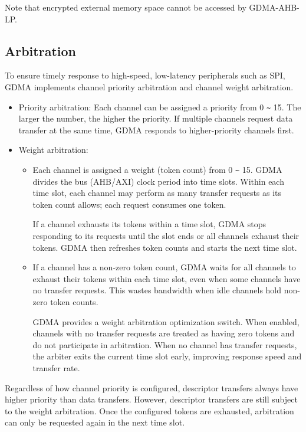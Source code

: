 \documentclass[main\_\_EN.tex]{subfiles}
\begin{document}
Note that encrypted external memory space cannot be accessed by GDMA-AHB-LP.


\subsection{Arbitration}

To ensure timely response to high-speed, low-latency peripherals such as SPI, GDMA implements channel priority arbitration and channel weight arbitration.

\begin{itemize}
    \item Priority arbitration: Each channel can be assigned a priority from 0 \verb+~+ 15. The larger the number, the higher the priority. If multiple channels request data transfer at the same time, GDMA responds to higher-priority channels first.
    \item Weight arbitration:
        \begin{itemize}
            \item Each channel is assigned a weight (token count) from 0 \verb+~+ 15. GDMA divides the bus (AHB/AXI) clock period into time slots. Within each time slot, each channel may perform as many transfer requests as its token count allows; each request consumes one token.

            If a channel exhausts its tokens within a time slot, GDMA stops responding to its requests until the slot ends or all channels exhaust their tokens. GDMA then refreshes token counts and starts the next time slot.
            \item If a channel has a non-zero token count, GDMA waits for all channels to exhaust their tokens within each time slot, even when some channels have no transfer requests. This wastes bandwidth when idle channels hold non-zero token counts.

            GDMA provides a weight arbitration optimization switch. When enabled, channels with no transfer requests are treated as having zero tokens and do not participate in arbitration. When no channel has transfer requests, the arbiter exits the current time slot early, improving response speed and transfer rate.
        \end{itemize}
\end{itemize}

Regardless of how channel priority is configured, descriptor transfers always have higher priority than data transfers. However, descriptor transfers are still subject to the weight arbitration. Once the configured tokens are exhausted, arbitration can only be requested again in the next time slot.
\end{document}
